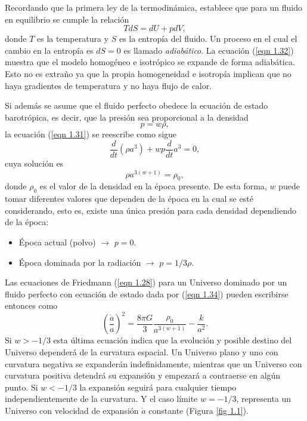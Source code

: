 \documentclass[a4paper,openright,10pt, oneside, final]{book}
\begin{document}
Recordando que la primera ley de la termodinámica, establece que para un fluido en equilibrio se cumple la relación
\begin{equation}
TdS = dU +pdV, \label{eqn 1.33}
\end{equation}
donde $T$ es la temperatura y $S$ es la entropía del fluido. Un proceso en el cual el cambio en la entropía es $dS = 0$ es llamado \textit{adiabático}. La ecuación (\ref{eqn 1.32}) muestra que el modelo homogéneo e isotrópico se expande de forma adiabática. Esto no es extraño ya que la propia homogeneidad e isotropía implican que no haya gradientes de temperatura y no haya flujo de calor.

Si además se asume que el fluido perfecto obedece la ecuación de estado barotrópica, es decir, que la presión sea proporcional a la densidad
\begin{equation}
p = w\rho, \label{eqn 1.34}
\end{equation}
la ecuación (\ref{eqn 1.31}) se reescribe como sigue
\begin{equation}
\frac{d}{dt}(\rho a^{3}) + w p \frac{d}{dt} a^{3} = 0,\label{eqn 1.35}
\end{equation}
cuya solución es
\begin{equation}
\rho a^{3(w + 1)} = \rho _{0}, \label{eqn 1.36}
\end{equation}
donde $\rho _{0}$ es el valor de la densidad en la época presente. De esta forma, $w$ puede tomar diferentes valores que dependen de la época en la cual se esté considerando, esto es, existe una única presión para cada densidad dependiendo de la época:
\begin{itemize}
\item Época actual (polvo) $\rightarrow$ $p=0$.
\item Época dominada por la radiación $\rightarrow$ $p = 1/3 \rho$.
\end{itemize}
Las ecuaciones de Friedmann (\ref{eqn 1.28}) para un Universo dominado por un fluido perfecto con ecuación de estado dada por (\ref{eqn 1.34}) pueden escribirse entonces como
\begin{equation}
\left(\frac{\dot{a}}{a}\right)^{2}
=
\frac{8 \pi G}{3} \frac{\rho _{0}}{a^{3(w + 1)}} - \frac{k}{a^{2}}.\label{eqn 1.37}
\end{equation}
Si $w > -1/3$ esta última ecuación indica que la evolución y posible destino del Universo dependerá de la curvatura espacial. Un Universo plano y uno con curvatura negativa se expanderán indefinidamente, mientras que un Universo con curvatura positiva detendrá su expansión y empezará a contraerse en algún punto. Si $w < -1/3$ la expansión seguirá para cualquier tiempo independientemente de la curvatura. Y el caso límite $w = - 1/3$, representa un Universo con velocidad de expansión $\dot{a}$ constante (Figura \ref{fig 1.1}).
\end{document}
